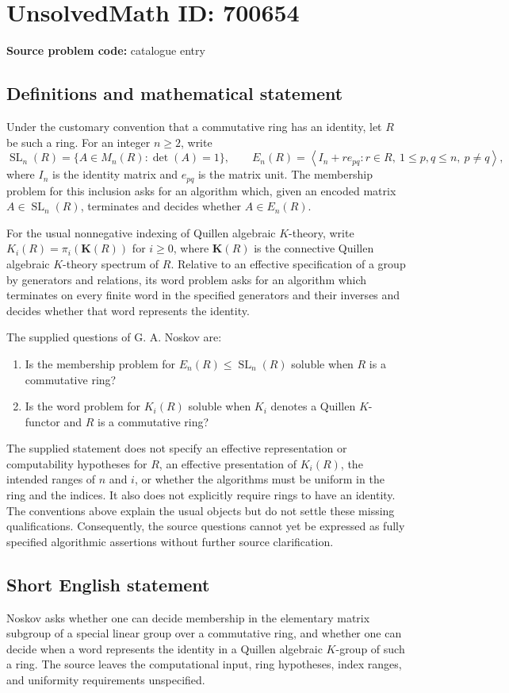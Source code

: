 \documentclass[11pt]{article}
\begin{document}
\section*{UnsolvedMath ID: 700654}
\textbf{Source problem code:} catalogue entry
\subsection{Definitions and mathematical statement}
Under the customary convention that a commutative ring has an identity, let \(R\) be such a ring. For an integer \(n\geq 2\), write
\[
\operatorname{SL}_n(R)=\{A\in M_n(R):\det(A)=1\},
\qquad
E_n(R)=\left\langle I_n+r e_{pq}:r\in R,\ 1\leq p,q\leq n,\ p\neq q\right\rangle,
\]
where \(I_n\) is the identity matrix and \(e_{pq}\) is the matrix unit. The membership problem for this inclusion asks for an algorithm which, given an encoded matrix \(A\in\operatorname{SL}_n(R)\), terminates and decides whether \(A\in E_n(R)\).

For the usual nonnegative indexing of Quillen algebraic \(K\)-theory, write \(K_i(R)=\pi_i(\mathbf K(R))\) for \(i\geq 0\), where \(\mathbf K(R)\) is the connective Quillen algebraic \(K\)-theory spectrum of \(R\). Relative to an effective specification of a group by generators and relations, its word problem asks for an algorithm which terminates on every finite word in the specified generators and their inverses and decides whether that word represents the identity.

The supplied questions of G. A. Noskov are:
\begin{enumerate}
\item[(a)] Is the membership problem for \(E_n(R)\leq\operatorname{SL}_n(R)\) soluble when \(R\) is a commutative ring?
\item[(b)] Is the word problem for \(K_i(R)\) soluble when \(K_i\) denotes a Quillen \(K\)-functor and \(R\) is a commutative ring?
\end{enumerate}
The supplied statement does not specify an effective representation or computability hypotheses for \(R\), an effective presentation of \(K_i(R)\), the intended ranges of \(n\) and \(i\), or whether the algorithms must be uniform in the ring and the indices. It also does not explicitly require rings to have an identity. The conventions above explain the usual objects but do not settle these missing qualifications. Consequently, the source questions cannot yet be expressed as fully specified algorithmic assertions without further source clarification.
\subsection{Short English statement}
Noskov asks whether one can decide membership in the elementary matrix subgroup of a special linear group over a commutative ring, and whether one can decide when a word represents the identity in a Quillen algebraic \(K\)-group of such a ring. The source leaves the computational input, ring hypotheses, index ranges, and uniformity requirements unspecified.
\end{document}
